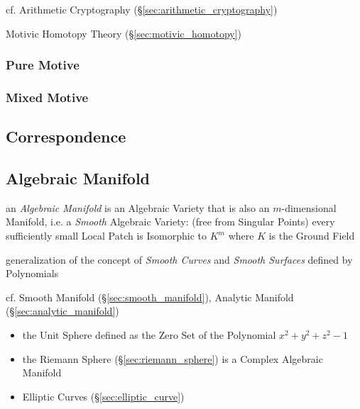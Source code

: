 cf. Arithmetic Cryptography (\S\ref{sec:arithmetic_cryptography})

Motivic Homotopy Theory (\S\ref{sec:motivic_homotopy})



\subsubsection{Pure Motive}\label{sec:pure_motive}

\subsubsection{Mixed Motive}\label{sec:mixed_motive}



\subsection{Correspondence}\label{sec:variety_correspondence}

\subsection{Algebraic Manifold}\label{sec:algebraic_manifold}

an \emph{Algebraic Manifold} is an Algebraic Variety that is also an
$m$-dimensional Manifold, i.e. a \emph{Smooth} Algebraic Variety:
(free from Singular Points) every sufficiently small Local Patch is Isomorphic
to $K^m$ where $K$ is the Ground Field

generalization of the concept of \emph{Smooth Curves} and \emph{Smooth
  Surfaces} defined by Polynomials

cf. Smooth Manifold (\S\ref{sec:smooth_manifold}), Analytic Manifold
(\S\ref{sec:analytic_manifold})

\begin{itemize}
  \item the Unit Sphere defined as the Zero Set of the Polynomial
    $x^2 + y^2 + z^2 - 1$
  \item the Riemann Sphere (\S\ref{sec:riemann_sphere}) is a Complex Algebraic
    Manifold
  \item Elliptic Curves (\S\ref{sec:elliptic_curve})
\end{itemize}



